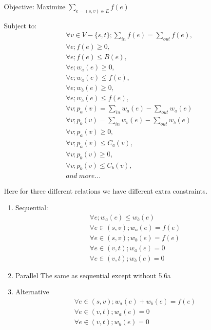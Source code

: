 \documentclass[twoside,leqno, 11pt]{article}
\begin{document}

Objective: Maximize $\sum \limits_{e=(s, v) \in E} f(e) $

Subject to:
\begin{subequations}
\begin{align}
&\forall v \in V-\{s, t\}; \sum\limits_{in}  f(e)= \sum\limits_{out} f(e),\\
&\forall e; f(e)\geq 0,\\
&\forall e; f(e)\leq B(e),\\
&\forall e; w_a(e) \geq 0,\\
&\forall e; w_a(e) \leq f(e),\\
&\forall e; w_b(e) \geq 0,\\
&\forall e; w_b(e) \leq f(e),\\
&\forall v; p_a(v) = \sum\limits_{in }w_a(e) - \sum\limits_{out} w_a(e) \\
&\forall v; p_b(v) = \sum\limits_{in } w_b(e) - \sum\limits_{out} w_b(e) \\
&\forall v; p_a(v)\geq 0 ,\\
&\forall v; p_a(v)\leq C_a(v),\\
&\forall v; p_b(v)\geq 0 ,\\
&\forall v; p_b(v)\leq C_b(v),\\
& and \; more \dots
\end{align}
\end{subequations}

Here for three different relations we have different extra constraints.
\begin{enumerate}
\item {Sequential:}
\begin{subequations}
\begin{align}
&\forall e; w_a(e) \leq w_b(e)\\
&\forall e\in (s,v); w_a(e)=f(e)\\
&\forall e\in (s,v); w_b(e)=f(e)\\
&\forall e\in (v,t); w_a(e)=0\\
&\forall e\in (v,t); w_b(e)=0
\end{align}
\end{subequations}
\item{Parallel}\newline
The same as sequential except without 5.6a
\item{Alternative}
\begin{subequations}
\begin{align}
&\forall e\in (s,v); w_a(e)+w_b(e)=f(e)\\
&\forall e\in (v,t); w_a(e)=0\\
&\forall e\in (v,t); w_b(e)=0
\end{align}
\end{subequations}
\end{enumerate}
\end{document}
